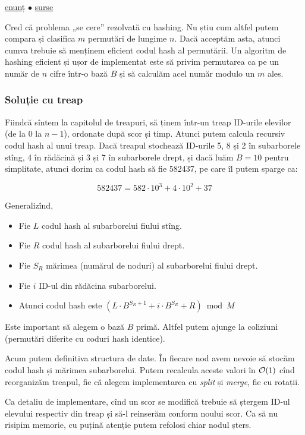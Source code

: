 \documentclass[../main.tex]{subfiles}
\begin{document}
\href{https://kilonova.ro/problems/1972}{enunț}
$\bullet$
\hyperref[code:clasament]{surse}

Cred că problema „se cere” rezolvată cu hashing. Nu știu cum altfel putem compara și clasifica $m$ permutări de lungime $n$. Dacă acceptăm asta, atunci cumva trebuie să menținem eficient codul hash al permutării. Un algoritm de hashing eficient și ușor de implementat este să privim permutarea ca pe un număr de $n$ cifre într-o bază $B$ și să calculăm acel număr modulo un $m$ ales.

\subsubsection*{Soluție cu treap}

Fiindcă sîntem la capitolul de treapuri, să ținem într-un treap ID-urile elevilor (de la $0$ la $n-1$), ordonate după scor și timp. Atunci putem calcula recursiv codul hash al unui treap. Dacă treapul stochează ID-urile 5, 8 și 2 în subarborele stîng, 4 în rădăcină și 3 și 7 în subarborele drept, și dacă luăm $B=10$ pentru simplitate, atunci dorim ca codul hash să fie 582437, pe care îl putem sparge ca:

$$582437 = 582 \cdot 10^3 + 4 \cdot 10^2 + 37$$

Generalizînd,

\begin{itemize}
  \item Fie $L$ codul hash al subarborelui fiului stîng.
  \item Fie $R$ codul hash al subarborelui fiului drept.
  \item Fie $S_R$ mărimea (numărul de noduri) al subarborelui fiului drept.
  \item Fie $i$ ID-ul din rădăcina subarborelui.
  \item Atunci codul hash este $(L \cdot B^{S_R + 1} + i \cdot B^{S_R} + R) \bmod M$
\end{itemize}

Este important să alegem o bază $B$ primă. Altfel putem ajunge la coliziuni (permutări diferite cu coduri hash identice).

Acum putem definitiva structura de date. În fiecare nod avem nevoie să stocăm codul hash și mărimea subarborelui. Putem recalcula aceste valori în $\mathcal{O}(1)$ cînd reorganizăm treapul, fie că alegem implementarea cu \textit{split} și \textit{merge}, fie cu rotații.

Ca detaliu de implementare, cînd un scor se modifică trebuie să ștergem ID-ul elevului respectiv din treap și să-l reinserăm conform noului scor. Ca să nu risipim memorie, cu puțină atenție putem refolosi chiar nodul șters.
\end{document}
